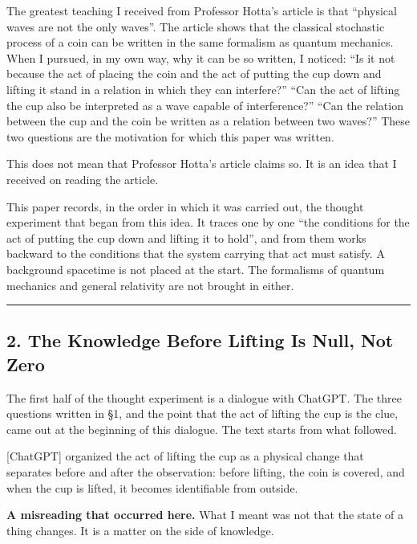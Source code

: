 \documentclass[
  a4paper,
]{article}
\begin{document}
The greatest teaching I received from Professor Hotta's article is that
``physical waves are not the only waves''. The article shows that the
classical stochastic process of a coin can be written in the same
formalism as quantum mechanics. When I pursued, in my own way, why it
can be so written, I noticed: ``Is it not because the act of placing the
coin and the act of putting the cup down and lifting it stand in a
relation in which they can interfere?'' ``Can the act of lifting the cup
also be interpreted as a wave capable of interference?'' ``Can the
relation between the cup and the coin be written as a relation between
two waves?'' These two questions are the motivation for which this paper
was written.

This does not mean that Professor Hotta's article claims so. It is an
idea that I received on reading the article.

This paper records, in the order in which it was carried out, the
thought experiment that began from this idea. It traces one by one ``the
conditions for the act of putting the cup down and lifting it to hold'',
and from them works backward to the conditions that the system carrying
that act must satisfy. A background spacetime is not placed at the
start. The formalisms of quantum mechanics and general relativity are
not brought in either.

\begin{center}\rule{0.5\linewidth}{0.5pt}\end{center}

\subsection{2. The Knowledge Before Lifting Is Null, Not
Zero}\label{the-knowledge-before-lifting-is-null-not-zero}

The first half of the thought experiment is a dialogue with ChatGPT. The
three questions written in §1, and the point that the act of lifting the
cup is the clue, came out at the beginning of this dialogue. The text
starts from what followed.

{[}ChatGPT{]} organized the act of lifting the cup as a physical change
that separates before and after the observation: before lifting, the
coin is covered, and when the cup is lifted, it becomes identifiable
from outside.

\textbf{A misreading that occurred here.} What I meant was not that the
state of a thing changes. It is a matter on the side of knowledge.
\end{document}
